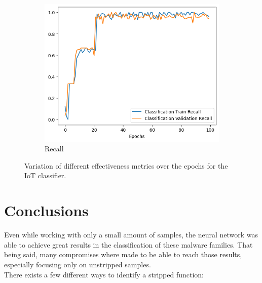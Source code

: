 \begin{figure}[H]
\begin{subfigure}{0.3\textwidth}
        \includegraphics[width=\linewidth]{Images/Rec_IoT.png}
        \caption{Recall}
        \label{fig:RecallIoT}
    \end{subfigure}
    \caption{Variation of different effectiveness metrics over the epochs for the IoT classifier.}
    \label{fig:MetricsIoT}
\end{figure}

\section{Conclusions}
Even while working with only a small amount of samples, the neural network was able to achieve great results in the classification of these malware families. That being said, many compromises where made to be able to reach those results, especially focusing only on unstripped samples. \\
There exists a few different ways to identify a stripped function:

